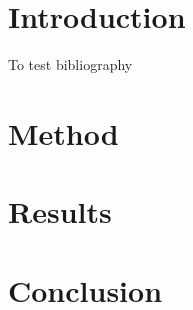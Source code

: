 \documentclass{report}
\begin{document}


\tableofcontents
\chapter{Introduction}
\label{sec:intro}
To test bibliography~\cite{Monaghan2005}

\chapter{Method}
\label{sec:method}

\chapter{Results}
\label{sec:results}

\chapter{Conclusion}
\label{sec:conclusion}



\end{document}
